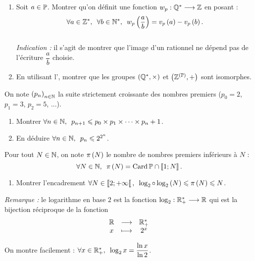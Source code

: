 \begin{corr}
\end{corr}

\begin{exo}
\begin{enumerate}
\item Soit \(a\in\mathbb{P}\). Montrer qu'on définit une fonction \(w_p:\mathbb{Q}^*\longrightarrow\mathbb{Z}\) en posant : \[\quantifs{\forall a\in\Zs;\forall b\in\Ns}w_p\paren{\dfrac{a}{b}}=\valp{p}{a}-\valp{p}{b}.\] \\

\textit{Indication :} il s'agit de montrer que l'image d'un rationnel ne dépend pas de l'écriture \(\dfrac{a}{b}\) choisie. \\

\item En utilisant l', montrer que les groupes \(\groupe{\Qs}[\times]\) et \(\groupe{\Z^{\paren{\prem}}}\) sont isomorphes.
\end{enumerate}
\end{exo}

\begin{corr}
\end{corr}

\begin{exo}
On note \(\left(p_n\right)_{n\in\mathbb{N}}\) la suite strictement croissante des nombres premiers (\cad \(p_0=2\), \(p_1=3\), \(p_2=5\), ...).

\begin{enumerate}[series=exsuitepremiers]
\item Montrer \(\quantifs{\forall n\in\N}p_{n+1}\leq p_0\times p_1\times\dots\times p_n+1\). \\

\item En déduire \(\quantifs{\forall n\in\N}p_n\leq2^{2^n}\).
\end{enumerate}

Pour tout \(N\in\mathbb{N}\), on note \(\pi\left(N\right)\) le nombre de nombres premiers inférieurs à \(N\) : \[\quantifs{\forall N\in\N}\pi\paren{N}=\Card\prem\inter\interventierii{1}{N}.\]

\begin{enumerate}[resume=exsuitepremiers]
\item Montrer l'encadrement \(\quantifs{\forall N\in\interventierie{2}{\pinf}}\log_2\rond\log_2\paren{N}\leq\pi\paren{N}\leq N\).
\end{enumerate}

\textit{Remarque :} le logarithme en base \(2\) est la fonction \(\log_2:\mathbb{R}_+^*\longrightarrow\mathbb{R}\) qui est la bijection réciproque de la fonction \[\begin{array}[t]{ccc}\mathbb{R} & \longrightarrow & \mathbb{R}_+^* \\ x & \longmapsto & 2^x\end{array}\]

On montre facilement : \(\quantifs{\forall x\in\Rps}\log_2 x=\dfrac{\ln x}{\ln2}\).
\end{exo}


